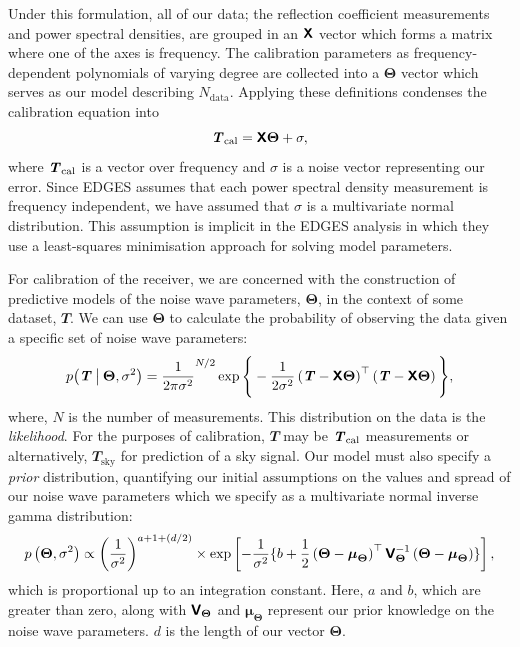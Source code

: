 Under this formulation, all of our data; the reflection coefficient measurements and power spectral densities, are grouped in an $\mathbfss{X}$ vector which forms a matrix where one of the axes is frequency. The calibration parameters as frequency-dependent polynomials of varying degree are collected into a $\boldsymbol{\boldsymbol{\Theta}}$ vector which serves as our model describing $N_{\mathrm{data}}$. Applying these definitions condenses the calibration equation into
\begin{equation}\label{eqn:linearmodel}
  \y = \mathbfss{X}\boldsymbol{\boldsymbol{\Theta}}+\sigma,
\end{equation}
where $\y$ is a vector over frequency and $\sigma$ is a noise vector representing our error. Since EDGES assumes that each power spectral density measurement is frequency independent, we have assumed that $\sigma$ is a multivariate normal distribution. This assumption is implicit in the EDGES analysis in which they use a least-squares minimisation approach for solving model parameters.

For calibration of the receiver, we are concerned with the construction of predictive models of the noise wave parameters, $\boldsymbol{\Theta}$, in the context of some dataset, $\mathbfit{T}$. We can use $\boldsymbol{\Theta}$ to calculate the probability of observing the data given a specific set of noise wave parameters:
\begin{equation}\label{likelihood}
    p\big(\mathbfit{T} \given[\big] \boldsymbol{\Theta}, \sigma^2\big) = \frac{1}{2\pi \sigma^2}^{N/2}\exp{ \Bigg\{ -\frac{1}{2\sigma^2}\left(\mathbfit{T}-\mathbfss{X}\boldsymbol{\Theta}\right)^{\top}\left(\mathbfit{T} -\mathbfss{X}\boldsymbol{\Theta}\right) \Bigg\}},
\end{equation}
where, $N$ is the number of measurements. This distribution on the data is the \textit{likelihood}. For the purposes of calibration, $\mathbfit{T}$ may be $\y$ measurements or alternatively, $\mathbfit{T}_{\mathrm{sky}}$ for prediction of a sky signal. Our model must also specify a \textit{prior} distribution, quantifying our initial assumptions on the values and spread of our noise wave parameters which we specify as a multivariate normal inverse gamma distribution:
\begin{equation}
  \label{eqn:prior}
  p\left(\boldsymbol{\Theta}, \sigma^2\right) \propto \left(\frac{1}{\sigma^2}\right)^{a+1+\left(d/2\right)} \times \exp \left[ -\frac{1}{\sigma^2}\{b+\frac{1}{2}\left(\boldsymbol{\Theta}-\boldsymbol{\mu}_{\boldsymbol{\Theta}}\right)^{\top}\mathbfss{V}_{\boldsymbol{\Theta}}^{-1}\left(\boldsymbol{\Theta}-\boldsymbol{\mu}_{\boldsymbol{\Theta}}\right)\} \right],
\end{equation}
which is proportional up to an integration constant. Here, $a$ and $b$, which are greater than zero, along with $\mathbfss{V}_{\boldsymbol{\Theta}}$ and $\boldsymbol{\mu}_{\boldsymbol{\Theta}}$ represent our prior knowledge on the noise wave parameters. $d$ is the length of our vector $\boldsymbol{\Theta}$.

